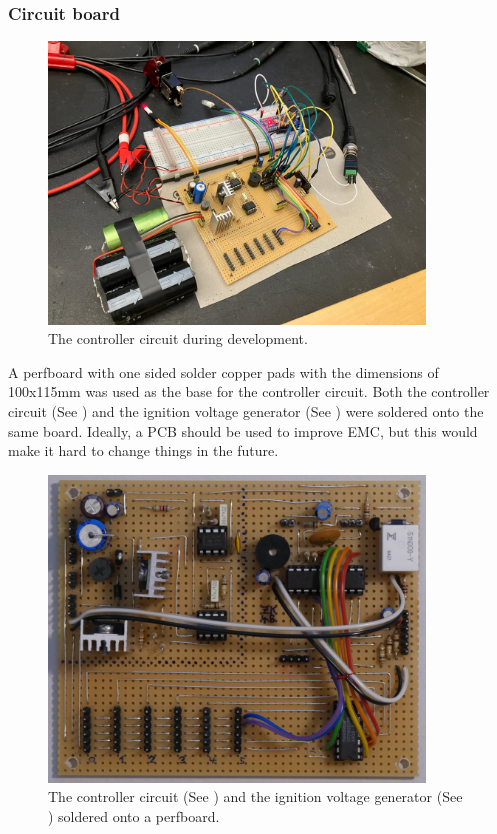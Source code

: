 
\pagebreak

\subsubsection{Circuit board}
\label{Circuitboard}

\begin{figure}[!ht]
    \centering
    \includegraphics[width=10cm]{./Figures/dev_controller.jpeg}
    \caption{The controller circuit during development.}
    \label{fig:dev_controller}     
\end{figure}

\noindent A perfboard with one sided solder copper pads with the dimensions of 100x115mm was used as the base for the controller circuit. Both the controller circuit (See ) and the ignition voltage generator (See ) were soldered onto the same board. Ideally, a PCB should be used to improve EMC, but this would make it hard to change things in the future. \\

\begin{figure}[!ht]
    \centering
    \includegraphics[width=10cm]{./Figures/controller_circuit_soldered.JPG}
    \caption{The controller circuit (See ) and the ignition voltage generator (See ) soldered onto a perfboard.   }
    \label{fig:controller_circuit_soldered}     
\end{figure}

